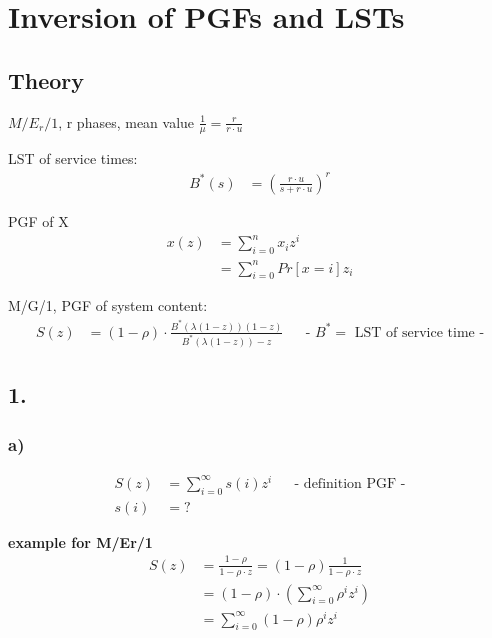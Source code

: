 \section{ Inversion of PGFs and LSTs }

\subsection*{ Theory }

$M/E_r/1$, r phases, mean value $\frac{1}{\mu }=\frac{r}{r\cdot u}$

LST of service times:
\begin{align*}
B^{{\ast }}\left(s\right)&=\left(\frac{r\cdot u}{s+r\cdot u}\right)^{r}
\end{align*}

PGF of X
\begin{align*}
x\left(z\right)&=\sum _{{i=0}}^{n}x_{i}z^{i}\\
&=\sum _{{i=0}}^{n}Pr\left[x=i\right]z_{i}
\end{align*}

M/G/1, PGF of system content:
\begin{align*}
S\left(z\right)&=\left(1-\rho \right)\cdot \frac{B^{{\ast }}\left(\lambda \left(1-z\right)\right)\left(1-z\right)}{B^{{\ast }}\left(\lambda \left(1-z\right)\right)-z}&& \text{-  $B^{{\ast }}=$ LST of service time -}
\end{align*}

\subsection*{ 1. }

\subsubsection*{ a) }
\begin{align*}
S\left(z\right)&=\sum _{{i=0}}^{\infty }s\left(i\right)z^{i}&& \text{-  definition PGF -}\\
s\left(i\right)&=?
\end{align*}

\textbf{example for M/Er/1}
\begin{align*}
S\left(z\right)&=\frac{1-\rho }{1-\rho \cdot z}=\left(1-\rho \right)\frac{1}{1-\rho \cdot z}\\
&=\left(1-\rho \right)\cdot \left(\sum _{{i=0}}^{\infty }\rho ^{i}z^{i}\right)\\
&=\sum _{{i=0}}^{\infty }\left(1-\rho \right)\rho ^{i}z^{i}
\end{align*}

